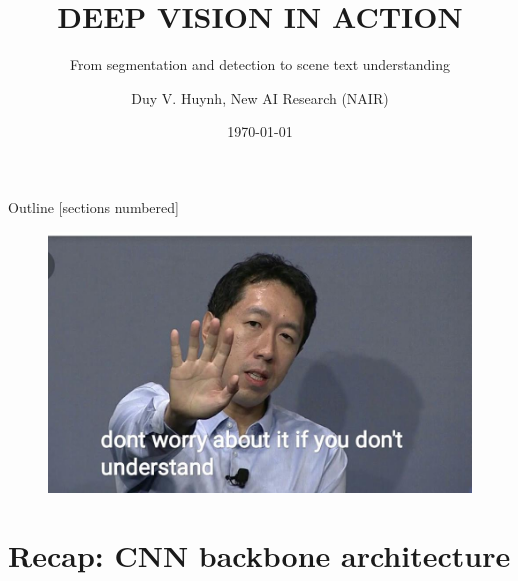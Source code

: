 \documentclass[aspectratio=169]{beamer}
\title{DEEP VISION IN ACTION}
\subtitle{From segmentation and detection to scene text understanding}
\date{\today}
\author{Duy V. Huynh, New AI Research (NAIR)}
\begin{document}
\maketitle

\begin{frame}{Outline}
  [sections numbered]
  \tableofcontents[hideallsubsections]
\end{frame}

\begin{frame}
\begin{figure}
    \centering
    \includegraphics[scale=.4]{demo/figs/andrew.jpg}
\end{figure}
\end{frame}

\section{Recap: CNN backbone architecture}
\end{document}
